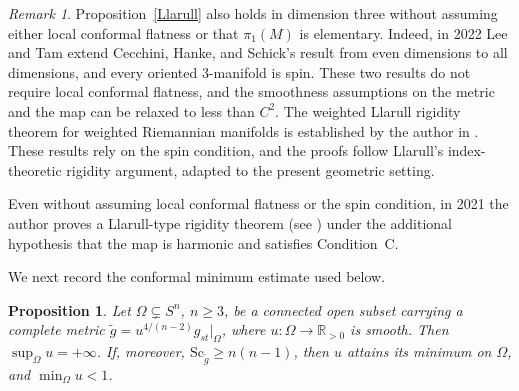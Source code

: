 \documentclass[12pt,oneside,a4paper]{article}
\newtheorem{proposition}[definition]{Proposition}
\theoremstyle{mytheorem}
\theoremstyle{remark}
\newtheorem{remark}[definition]{Remark}
\theoremstyle{definition}
\begin{document}
\begin{remark}
Proposition~\ref{Llarull} also holds in dimension three without assuming either local conformal flatness or that $\pi_1(M)$ is elementary. Indeed, in 2022 Lee and Tam \cite{LeeTam2026} extend  Cecchini, Hanke, and Schick's result \cite{zbMATH08176144} from even dimensions to all dimensions, and every oriented $3$-manifold is spin. These two results do not require local conformal flatness, and the smoothness assumptions on the metric and the map can be relaxed to less than \(C^{2}\).  The weighted Llarull rigidity theorem for weighted Riemannian manifolds is established by the author in \cite[Theorem~1.3]{zbMATH07342230}. These results rely on the spin condition, and the proofs follow Llarull's index-theoretic rigidity argument, adapted to the present geometric setting.


Even without assuming local conformal flatness or the spin condition, in 2021 the author proves a Llarull-type rigidity theorem (see \cite[Theorem~A]{zbMATH07544449}) under the additional hypothesis that the map is harmonic and satisfies Condition~C.
\end{remark}

We next record the conformal minimum estimate used below.


\begin{proposition}\label{minimum}
Let \(\Omega\subsetneq S^n\), \(n\geq3\), be a connected open subset
carrying a complete metric
\(\tilde g=u^{4/(n-2)}g_{st}\big|_\Omega\), where
\(u\colon\Omega\to\mathbb{R}_{>0}\) is smooth. Then
\(\sup_\Omega u=+\infty\). If, moreover,
\(\mathrm{Sc}_{\tilde g}\geq n(n-1)\), then \(u\)
attains its minimum on $\Omega$, and $\min_\Omega u<1$.
\end{proposition}
\end{document}
